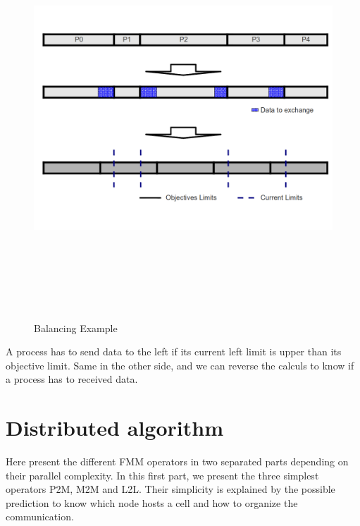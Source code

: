 \documentclass[12pt,letterpaper,titlepage]{report}
\begin{document}
\begin{figure}[h!]
  \begin{center}
    \includegraphics[width=15cm, height=15cm, keepaspectratio=true]{Images/Balance.png}
    \caption{Balancing Example}
  \end{center}
\end{figure}

A process has to send data to the left if its current left limit is upper than its objective limit.
Same in the other side, and we can reverse the calculs to know if a process has to received data.


\chapter{Distributed algorithm} 

Here present the different FMM operators in two separated parts
depending on their parallel complexity.  In this first part, we
present the three simplest operators P2M, M2M and L2L.  Their
simplicity is explained by the possible prediction to know which node
hosts a cell and how to organize the communication.
\end{document}
